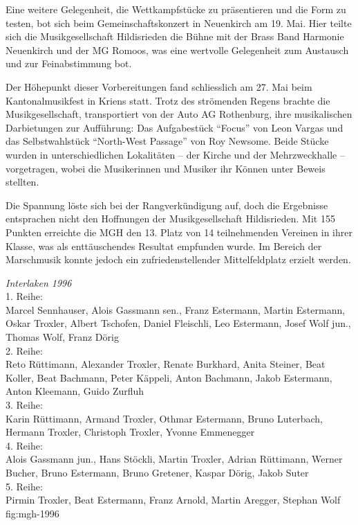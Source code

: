 \begin{history}
    Eine weitere Gelegenheit, die Wettkampfstücke zu präsentieren und die Form
    zu testen, bot sich beim Gemeinschaftskonzert in Neuenkirch am 19. Mai. Hier
    teilte sich die Musikgesellschaft Hildisrieden die Bühne mit der Brass Band
    Harmonie Neuenkirch und der MG Romoos, was eine wertvolle Gelegenheit zum
    Austausch und zur Feinabstimmung bot.

    Der Höhepunkt dieser Vorbereitungen fand schliesslich am 27. Mai beim
    Kantonalmusikfest in Kriens statt. Trotz des strömenden Regens brachte die
    Musikgesellschaft, transportiert von der Auto AG Rothenburg, ihre
    musikalischen Darbietungen zur Aufführung: Das Aufgabestück \enquote{Focus}
    von Leon Vargas und das Selbstwahlstück \enquote{North-West Passage} von Roy
    Newsome. Beide Stücke wurden in unterschiedlichen Lokalitäten -- der Kirche
    und der Mehrzweckhalle -- vorgetragen, wobei die Musikerinnen und Musiker
    ihr Können unter Beweis stellten.

    Die Spannung löste sich bei der Rangverkündigung auf, doch die Ergebnisse
    entsprachen nicht den Hoffnungen der Musikgesellschaft Hildisrieden. Mit 155
    Punkten erreichte die MGH den 13. Platz von 14 teilnehmenden Vereinen in
    ihrer Klasse, was als enttäuschendes Resultat empfunden wurde. Im Bereich
    der Marschmusik konnte jedoch ein zufriedenstellender Mittelfeldplatz
    erzielt werden.

\end{history}

{\emph{Interlaken 1996}\\
    1. Reihe:\\
    Marcel Sennhauser, Alois Gassmann sen., Franz Estermann, Martin Estermann,
    Oskar Troxler, Albert Tschofen, Daniel Fleischli, Leo Estermann, Josef Wolf
    jun., Thomas Wolf, Franz Dörig\\
    2. Reihe:\\
    Reto Rüttimann, Alexander Troxler, Renate Burkhard, Anita Steiner, Beat
    Koller, Beat Bachmann, Peter Käppeli, Anton Bachmann, Jakob Estermann, Anton
    Kleemann, Guido Zurfluh\\
    3. Reihe:\\
    Karin Rüttimann, Armand Troxler, Othmar Estermann, Bruno Luterbach, Hermann
    Troxler, Christoph Troxler, Yvonne Emmenegger\\
    4. Reihe:\\
    Alois Gassmann jun., Hans Stöckli, Martin Troxler, Adrian Rüttimann, Werner
    Bucher, Bruno Estermann, Bruno Gretener, Kaspar Dörig, Jakob Suter\\
    5. Reihe:\\
    Pirmin Troxler, Beat Estermann, Franz Arnold, Martin Aregger, Stephan Wolf }
{fig:mgh-1996}




